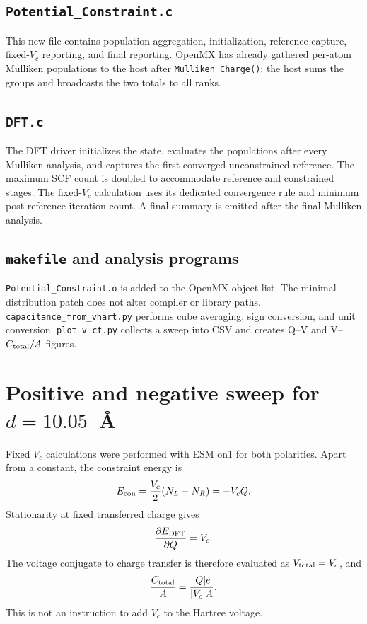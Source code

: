 \documentclass[11pt,a4paper]{article}
\begin{document}
\subsection{\texttt{Potential\_Constraint.c}}
This new file contains population aggregation, initialization, reference
capture, fixed-$V_c$ reporting, and final reporting. OpenMX has already gathered
per-atom Mulliken populations to the host after
\texttt{Mulliken\_Charge()}; the host sums the groups and broadcasts the
two totals to all ranks.

\subsection{\texttt{DFT.c}}
The DFT driver initializes the state, evaluates the populations after every
Mulliken analysis, and captures the first converged unconstrained reference.
The maximum SCF count is doubled to accommodate reference and constrained
stages. The fixed-$V_c$ calculation uses its dedicated convergence rule and minimum
post-reference iteration count. A final summary is emitted after the final
Mulliken analysis.

\subsection{\texttt{makefile} and analysis programs}
\texttt{Potential\_Constraint.o} is added to the OpenMX object list. The minimal
distribution patch does not alter compiler or library paths.
\texttt{capacitance\_from\_vhart.py} performs cube averaging, sign conversion,
and unit conversion. \texttt{plot\_v\_ct.py} collects a sweep into CSV and
creates Q--V and V--$C_{\rm total}/A$ figures.

\section{Positive and negative sweep for $d=10.05$~\AA}

Fixed $V_c$ calculations were performed with ESM on1 for both polarities.
Apart from a constant, the constraint energy is
\begin{equation}
 E_{\rm con}=\frac{V_c}{2}(N_L-N_R)=-V_cQ.
\end{equation}
Stationarity at fixed transferred charge gives
\begin{equation}
 \frac{\partial E_{\rm DFT}}{\partial Q}=V_c.
\end{equation}
The voltage conjugate to charge transfer is therefore evaluated as
$V_{\rm total}=V_c$, and
\begin{equation}
 \frac{C_{\rm total}}{A}=\frac{|Q|e}{|V_c|A}.
\end{equation}
This is not an instruction to add $V_c$ to the Hartree voltage.
\end{document}
